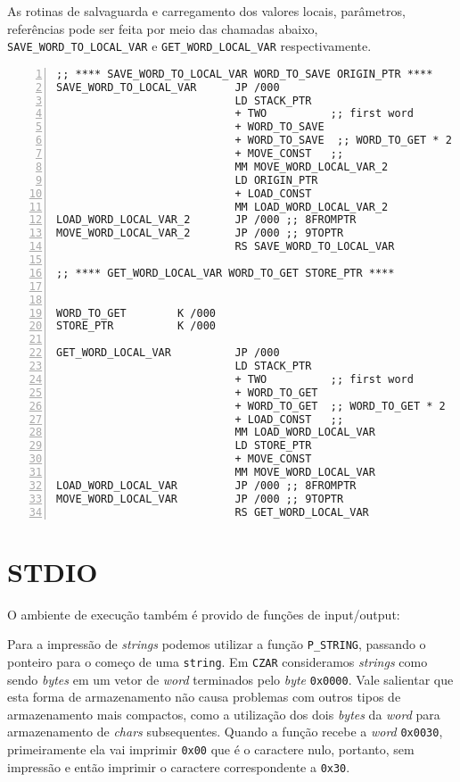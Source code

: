 As rotinas de salvaguarda e carregamento dos valores locais, parâmetros,
   referências pode ser feita por meio das chamadas abaixo, 
   \verb!SAVE_WORD_TO_LOCAL_VAR! e \verb!GET_WORD_LOCAL_VAR! respectivamente.

\begin{lstlisting}[basicstyle=\footnotesize,numbers=left,breaklines=true,morekeywords={}]
;; **** SAVE_WORD_TO_LOCAL_VAR WORD_TO_SAVE ORIGIN_PTR ****
SAVE_WORD_TO_LOCAL_VAR      JP /000 
                            LD STACK_PTR
                            + TWO          ;; first word 
                            + WORD_TO_SAVE 
                            + WORD_TO_SAVE  ;; WORD_TO_GET * 2
                            + MOVE_CONST   ;; 
                            MM MOVE_WORD_LOCAL_VAR_2
                            LD ORIGIN_PTR
                            + LOAD_CONST 
                            MM LOAD_WORD_LOCAL_VAR_2
LOAD_WORD_LOCAL_VAR_2       JP /000 ;; 8FROMPTR
MOVE_WORD_LOCAL_VAR_2       JP /000 ;; 9TOPTR
                            RS SAVE_WORD_TO_LOCAL_VAR

;; **** GET_WORD_LOCAL_VAR WORD_TO_GET STORE_PTR ****


WORD_TO_GET        K /000 
STORE_PTR          K /000

GET_WORD_LOCAL_VAR          JP /000 
                            LD STACK_PTR
                            + TWO          ;; first word 
                            + WORD_TO_GET  
                            + WORD_TO_GET  ;; WORD_TO_GET * 2
                            + LOAD_CONST   ;; 
                            MM LOAD_WORD_LOCAL_VAR  
                            LD STORE_PTR
                            + MOVE_CONST 
                            MM MOVE_WORD_LOCAL_VAR
LOAD_WORD_LOCAL_VAR         JP /000 ;; 8FROMPTR
MOVE_WORD_LOCAL_VAR         JP /000 ;; 9TOPTR
                            RS GET_WORD_LOCAL_VAR
 \end{lstlisting}


 \section{STDIO}


O ambiente de execução também é provido de funções de input/output:

Para a impressão de \emph{strings} podemos utilizar a função \verb!P_STRING!, 
     passando o ponteiro para o começo de uma \verb!string!. Em \verb!CZAR!
     consideramos \emph{strings} como sendo \emph{bytes} em um vetor de
     \emph{word} terminados pelo \emph{byte} \verb!0x0000!. Vale salientar que
     esta forma de armazenamento não causa problemas com outros tipos de
     armazenamento mais compactos, como a utilização dos dois \emph{bytes}
     da \emph{word} para armazenamento de \emph{chars} subsequentes. Quando a
     função recebe a \emph{word} \verb!0x0030!, primeiramente ela vai imprimir
     \verb!0x00! que é o caractere nulo, portanto, sem impressão e então
     imprimir o caractere correspondente a \verb!0x30!. 

